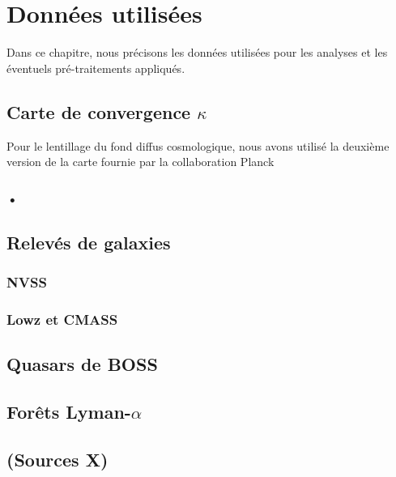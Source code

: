 
\chapter{Données utilisées} %

\label{Chapter6} %


Dans ce chapitre, nous précisons les données utilisées pour les analyses et les éventuels pré-traitements appliqués.

\section{Carte de convergence $\kappa$}

Pour le lentillage du fond diffus cosmologique, nous avons utilisé la deuxième version de la carte fournie par la collaboration Planck 

\subsection{•}


\section{Relevés de galaxies}
\subsection{NVSS}
\subsection{Lowz et CMASS}
\section{Quasars de BOSS}
\section{Forêts Lyman-$\alpha$}
\section{(Sources X)}
